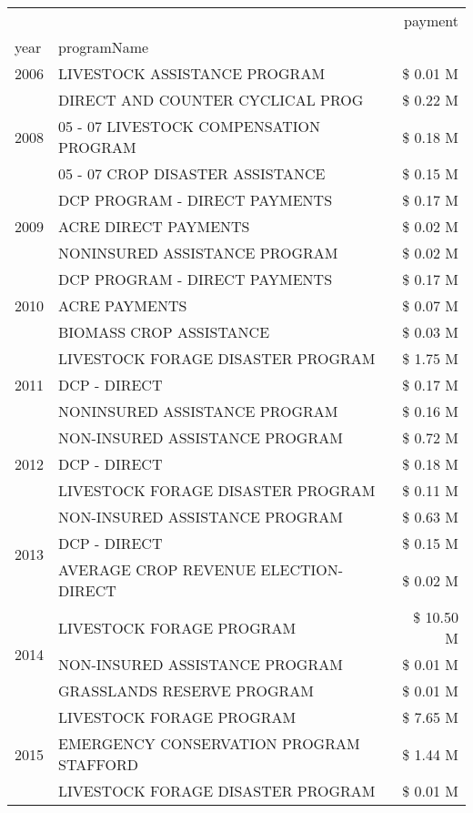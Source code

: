 \begin{tabular}{llr}
\toprule
 &  & payment \\
year & programName &  \\
\midrule
2006 & LIVESTOCK ASSISTANCE PROGRAM & \$ 0.01 M \\
\cline{1-3}
\multirow[t]{3}{*}{2008} & DIRECT AND COUNTER CYCLICAL PROG & \$ 0.22 M \\
 & 05 - 07 LIVESTOCK COMPENSATION PROGRAM & \$ 0.18 M \\
 & 05 - 07 CROP DISASTER ASSISTANCE & \$ 0.15 M \\
\cline{1-3}
\multirow[t]{3}{*}{2009} & DCP PROGRAM - DIRECT PAYMENTS & \$ 0.17 M \\
 & ACRE DIRECT PAYMENTS & \$ 0.02 M \\
 & NONINSURED ASSISTANCE PROGRAM & \$ 0.02 M \\
\cline{1-3}
\multirow[t]{3}{*}{2010} & DCP PROGRAM - DIRECT PAYMENTS & \$ 0.17 M \\
 & ACRE PAYMENTS & \$ 0.07 M \\
 & BIOMASS CROP ASSISTANCE & \$ 0.03 M \\
\cline{1-3}
\multirow[t]{3}{*}{2011} & LIVESTOCK FORAGE DISASTER PROGRAM & \$ 1.75 M \\
 & DCP - DIRECT & \$ 0.17 M \\
 & NONINSURED ASSISTANCE PROGRAM & \$ 0.16 M \\
\cline{1-3}
\multirow[t]{3}{*}{2012} & NON-INSURED ASSISTANCE PROGRAM & \$ 0.72 M \\
 & DCP - DIRECT & \$ 0.18 M \\
 & LIVESTOCK FORAGE DISASTER PROGRAM & \$ 0.11 M \\
\cline{1-3}
\multirow[t]{3}{*}{2013} & NON-INSURED ASSISTANCE PROGRAM & \$ 0.63 M \\
 & DCP - DIRECT & \$ 0.15 M \\
 & AVERAGE CROP REVENUE ELECTION-DIRECT & \$ 0.02 M \\
\cline{1-3}
\multirow[t]{3}{*}{2014} & LIVESTOCK FORAGE PROGRAM & \$ 10.50 M \\
 & NON-INSURED ASSISTANCE PROGRAM & \$ 0.01 M \\
 & GRASSLANDS RESERVE PROGRAM & \$ 0.01 M \\
\cline{1-3}
\multirow[t]{3}{*}{2015} & LIVESTOCK FORAGE PROGRAM & \$ 7.65 M \\
 & EMERGENCY CONSERVATION PROGRAM STAFFORD & \$ 1.44 M \\
 & LIVESTOCK FORAGE DISASTER PROGRAM & \$ 0.01 M \\

\end{tabular}
